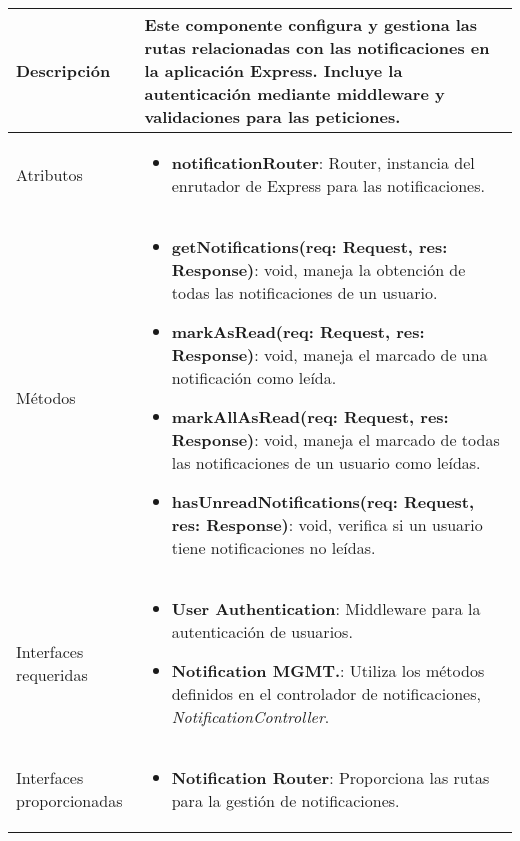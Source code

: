 \begin{longtable}{
    >{\columncolor{lightgreen!20}}p{4cm}
    p{12cm}
    }
    \midrule
    Descripción & Este componente configura y gestiona las rutas relacionadas con las notificaciones en la aplicación Express. Incluye la autenticación mediante middleware y validaciones para las peticiones. \\
    \midrule
    Atributos & \begin{itemize}[nosep,leftmargin=*]
      \item \textbf{notificationRouter}: Router, instancia del enrutador de Express para las notificaciones.
    \end{itemize} \\
    \midrule
    Métodos & \begin{itemize}[nosep,leftmargin=*]
      \item \textbf{getNotifications(req: Request, res: Response)}: void, maneja la obtención de todas las notificaciones de un usuario.
      \item \textbf{markAsRead(req: Request, res: Response)}: void, maneja el marcado de una notificación como leída.
      \item \textbf{markAllAsRead(req: Request, res: Response)}: void, maneja el marcado de todas las notificaciones de un usuario como leídas.
      \item \textbf{hasUnreadNotifications(req: Request, res: Response)}: void, verifica si un usuario tiene notificaciones no leídas.
    \end{itemize} \\
    \midrule
    Interfaces requeridas & \begin{itemize}[nosep,leftmargin=*]
      \item \textbf{User Authentication}: Middleware para la autenticación de usuarios.
      \item \textbf{Notification MGMT.}: Utiliza los métodos definidos en el controlador de notificaciones, \textit{NotificationController}.
    \end{itemize} \\
    \midrule
    Interfaces proporcionadas & \begin{itemize}[nosep,leftmargin=*]
        \item \textbf{Notification Router}: Proporciona las rutas para la gestión de notificaciones.
    \end{itemize} \\
    \end{longtable}

